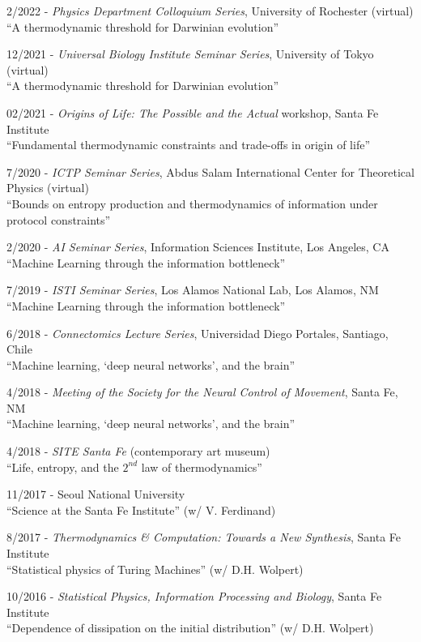 \documentclass[margin,line,centered]{res}
\begin{document}
\begin{resume}
2/2022 - \emph{Physics Department Colloquium Series}, University of Rochester (virtual)\\
``A thermodynamic threshold for Darwinian evolution'' %

12/2021 - \emph{Universal Biology Institute Seminar Series}, University of Tokyo (virtual)\\
``A thermodynamic threshold for Darwinian evolution'' %

02/2021 - \emph{Origins of Life: The Possible and the Actual} workshop, Santa Fe Institute\\
``Fundamental thermodynamic constraints and trade-offs in origin of life'' %


7/2020 - \emph{ICTP Seminar Series}, Abdus Salam International Center for Theoretical Physics (virtual)\\
``Bounds on entropy production and thermodynamics of information under protocol constraints'' %


2/2020 - \emph{AI Seminar Series}, Information Sciences Institute, Los Angeles, CA\\
``Machine Learning through the information bottleneck'' %

7/2019 - \emph{ISTI Seminar Series}, Los Alamos National Lab, Los Alamos, NM\\
``Machine Learning through the information bottleneck''  %


6/2018 - \emph{Connectomics Lecture Series}, Universidad Diego Portales, Santiago, Chile\\
``Machine learning, `deep neural networks', and the brain''  %

4/2018 - \emph{Meeting of the Society for the Neural Control of Movement}, Santa Fe, NM\\
``Machine learning, `deep neural networks', and the brain''

4/2018 - \emph{SITE Santa Fe} (contemporary art museum)\\
``Life, entropy, and the $2^{{nd}}$ law of thermodynamics''

11/2017 - Seoul National University\\
``Science at the Santa Fe Institute'' (w/ V. Ferdinand) %

8/2017 - \emph{Thermodynamics \& Computation: Towards a New Synthesis}, Santa Fe Institute\\
``Statistical physics of Turing Machines'' (w/ D.H. Wolpert) %

10/2016 - \emph{Statistical Physics, Information Processing and Biology}, Santa Fe Institute \\
``Dependence of dissipation on the initial distribution'' (w/ D.H. Wolpert) %


\end{resume}
\end{document}
